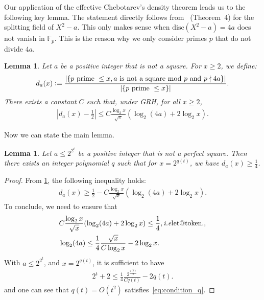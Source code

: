 \documentclass[a4paper, 11pt,dvipsnames]{article}
\makeatletter
\newtheorem{lemma}[theorem]{Lemma}
\DeclareRobustCommand\onedot{\futurelet\@let@token\@onedot}
\def\@onedot{\ifx\@let@token.\else.\null\fi\xspace}
\def\ie{\emph{i.e}\onedot} \def\Ie{\emph{I.e}\onedot}
\newcommand{\eqdef}{\vcentcolon =}
\makeatother
\begin{document}
			Our application of the effective Chebotarev's density theorem leads us to the following key lemma. The statement directly follows from~\cite{serre1981quelques} (Theorem~4) for the splitting field of $X^2 - a$. This only makes sense when $\mathrm{disc}(X^2 -a) = 4a$ does not vanish in $\mathbb{F}_p$. This is the reason why we only consider primes $p$ that do not divide $4a$.
			\begin{lemma} Let $a$ be a positive integer that is not a square. For $x \ge 2$, we define:  \begin{align*} d_a(x) \eqdef \frac{ \left| \{ p \text{ prime } \le x , a
						\text{ is not a square mod $p$ and } p \nmid 4a \} \right| }{\left| \{ p \text{ prime } \le x \} \right|} .  \end{align*} There exists a constant $C$ such
				that, under GRH, for all $x \ge 2$, \begin{align*} \left| d_a(x) - \frac{1}{2} \right| \le C \frac{\log_2 x}{\sqrt{x}}\left(  \log_2 (4a) + 2 \log_2 x \right).
				\end{align*} \label{lemma:density_ineq} \end{lemma}

			Now we can state the main lemma. 
			\begin{lemma} Let $a \le 2^{2^t}$ be a positive integer that is not a perfect square. 
				Then there exists an integer polynomial $q$ such that for $x = 2^{q(t)}$, we have $d_a(x) \ge \frac{1}{4}$.  \label{lemma:density_prime} \end{lemma}

			\begin{proof} From \cref{lemma:density_ineq}, the following inequality holds: \begin{align*} d_a(x) \ge \frac{1}{2} - C \frac{\log_2 x}{\sqrt{x}} (\log_2(4a)+
					2\log_2 x).  \end{align*} To conclude, we need to ensure that \begin{align*} &C \frac{\log_2 x}{\sqrt{x}} (\log_2(4a)+ 2\log_2 x) \le \frac{1}{4},
					\text{\ie,} \\ &\log_2(4a) \le \frac{1}{4}\frac{\sqrt{x}}{C \log_2 x} - 2\log_2 x.  \end{align*} With $a \le 2^{2^t}$, and $x = 2^{q(t)}$, it is sufficient to have
				\begin{align}
					2^t +2 \le \frac{1}{4}\frac{2^{\frac{q(t)}{2}}}{C q(t)} - 2 q(t).
					\label{eq:condition_q}
				\end{align}
				and one can see that $q(t) = O(t^2)$ satisfies~\cref{eq:condition_q}.
\end{proof}
\end{document}
